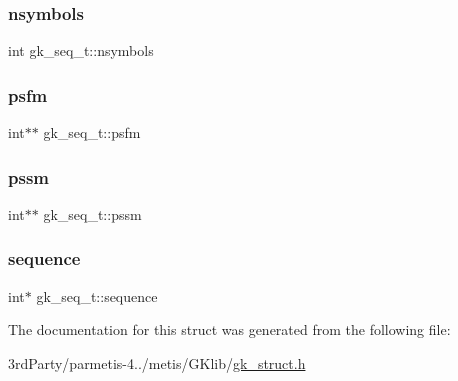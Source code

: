 \mbox{\label{structgk__seq__t_a876b72b49af40e66b978e33f87cda044}} 
\subsubsection{\texorpdfstring{nsymbols}{nsymbols}}
{\footnotesize\ttfamily int gk\+\_\+seq\+\_\+t\+::nsymbols}

\mbox{\label{structgk__seq__t_a2f3676712f6cbb159642884a3dff7eec}} 
\subsubsection{\texorpdfstring{psfm}{psfm}}
{\footnotesize\ttfamily int$\ast$$\ast$ gk\+\_\+seq\+\_\+t\+::psfm}

\mbox{\label{structgk__seq__t_aca3f51322bd7246f338394a442e37e7c}} 
\subsubsection{\texorpdfstring{pssm}{pssm}}
{\footnotesize\ttfamily int$\ast$$\ast$ gk\+\_\+seq\+\_\+t\+::pssm}

\mbox{\label{structgk__seq__t_a5a803ced386350dd152f047531035f81}} 
\subsubsection{\texorpdfstring{sequence}{sequence}}
{\footnotesize\ttfamily int$\ast$ gk\+\_\+seq\+\_\+t\+::sequence}



The documentation for this struct was generated from the following file\+:\begin{DoxyCompactItemize}
\item 
3rd\+Party/parmetis-\/4../metis/\+G\+Klib/\hyperlink{gk__struct_8h}{gk\+\_\+struct.\+h}\end{DoxyCompactItemize}
